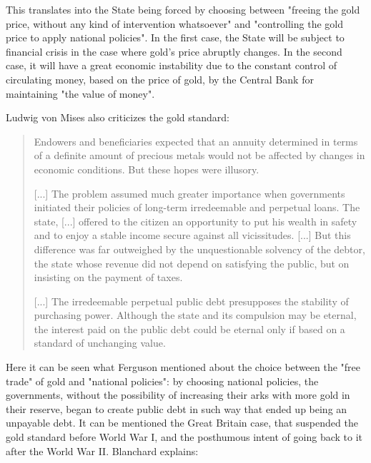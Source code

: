 \documentclass[12pt,a4paper,twoside]{book}
\begin{document}
This translates into the State being forced by choosing between "freeing the gold price, without any kind of intervention whatsoever" and "controlling the gold price to apply national policies". In the first case, the State will be subject to financial crisis in the case where gold's price abruptly changes. In the second case, it will have a great economic instability due to the constant control of circulating money, based on the price of gold, by the Central Bank for maintaining "the value of money".

Ludwig von Mises also criticizes the gold standard:

\begin{quotation}
Endowers and beneficiaries expected that an annuity determined in terms of a definite amount of precious metals would not be affected by changes in economic conditions. But these hopes were illusory.

[...] The problem assumed much greater importance when governments initiated their policies of long-term irredeemable and perpetual loans. The state, [...] offered to the citizen an opportunity to put his wealth in safety and to enjoy a stable income secure against all vicissitudes. [...] But this difference was far outweighed by the unquestionable solvency of the debtor, the state whose revenue did not depend on satisfying the public, but on insisting on the payment of taxes.

[...] The irredeemable perpetual public debt presupposes the stability of purchasing power. Although the state and its compulsion may be eternal, the interest paid on the public debt could be eternal only if based on a standard of unchanging value. \cite[pp. 226-227]{mises:ha}
\end{quotation}

Here it can be seen what Ferguson mentioned about the choice between the "free trade" of gold and "national policies": by choosing national policies, the governments, without the possibility of increasing their arks with more gold in their reserve, began to create public debt in such way that ended up being an unpayable debt. It can be mentioned the Great Britain case, that suspended the gold standard before World War I, and the posthumous intent of going back to it after the World War II. Blanchard explains:
\end{document}
